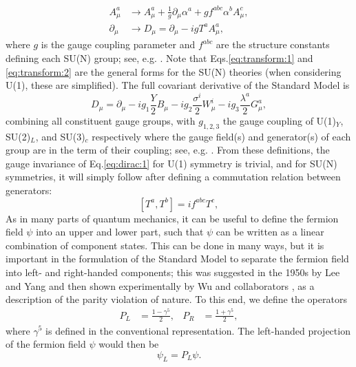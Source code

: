 \documentclass[a4paper,12pt]{article}
\begin{document}
\vspace{-18pt}
\begin{align}
    \label{eq:transform:1}
    A^a_\mu &\to A^a_\mu + \frac{1}{g}\partial_\mu\alpha^a + gf^{abc}\alpha^bA^c_\mu, \\
    \label{eq:transform:2}
    \partial_\mu &\to D_\mu = \partial_\mu - igT^aA^a_\mu,
\end{align}
where $g$ is the gauge coupling parameter and $f^{abc}$ are the structure constants defining each SU(N) group; see, e.g. \cite{schwartz}. 
Note that Eqs.\eqref{eq:transform:1} and \eqref{eq:transform:2} are the general forms for the SU(N) theories (when considering U(1), these are simplified).
The full covariant derivative of the Standard Model is
\begin{equation}
    \label{eq:covar}
    D_\mu = \partial_\mu - ig_1\frac{Y}{2}B_\mu - ig_2\frac{\sigma^i}{2}W^i_\mu - ig_3\frac{\lambda^a}{2}G^a_\mu,
\end{equation}
combining all constituent gauge groups, with $g_{1,2,3}$ the gauge coupling of U(1)$_Y$, SU(2)$_L$, and SU(3)$_c$ respectively where the gauge field(s) and generator(s) of each group are in the term of their coupling; see, e.g. \cite{schwartz}.   
From these definitions, the gauge invariance of Eq.\eqref{eq:dirac:1} for U(1) symmetry is trivial, and for SU(N) symmetries, it will simply follow after defining a commutation relation between generators:
\begin{equation}
    \label{eq:commute}
    [T^a,T^b] = if^{abc}T^c,
\end{equation}
As in many parts of quantum mechanics, it can be useful to define the fermion field $\psi$ into an upper and lower part, such that $\psi$ can be written as a linear combination of component states. 
This can be done in many ways, but it is important in the formulation of the Standard Model to separate the fermion field into left- and right-handed components; this was suggested in the 1950s by Lee and Yang \cite{lee} and then shown experimentally by Wu and collaborators \cite{wu}, as a description of the parity violation of nature. 
To this end, we define the operators
\begin{align}
    \label{eq:helix}
    P_L &= \frac{1-\gamma^5}{2}, & P_R &= \frac{1+\gamma^5}{2},
\end{align}
where $\gamma^5$ is defined in the conventional representation. 
The left-handed projection of the fermion field $\psi$ would then be
\begin{equation}
    \label{eq:projection}
    \psi_L = P_L\psi.
\end{equation}
\end{document}
